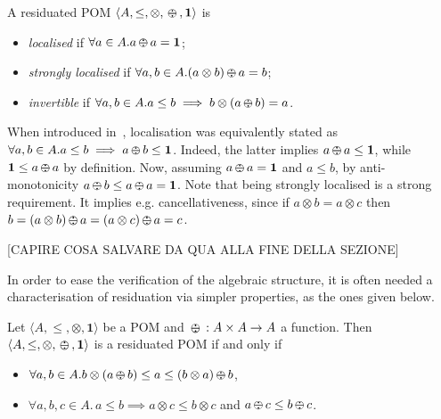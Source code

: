 \documentclass{llncs}
\def\1{{\mathbf 1}}
\def\monid{{\mathbf 0}}
\def\1{{\mathbf 1}}
\def\monop{\otimes}
\def\odiv{\, {\ominus\hspace{-7.7pt} \div} \,}
\def\monid{\mathbf{1}}
\begin{document}
\begin{definition}
	A residuated POM $\langle A, \leq, \monop, \odiv, \monid \rangle$ is
	\begin{itemize}
		\item
		\emph{localised} if $\forall a \in A. a \odiv a = \1$;
		\item
		\emph{strongly localised} if $\forall a, b \in A. (a \otimes b) \odiv a = b$;
		\item
		\emph{invertible} if $\forall a, b \in A. a \leq b \implies b \monop (a \odiv b) = a$.
	\end{itemize}
\end{definition}

\begin{remark}
When introduced in~\cite[Def.~2.4]{ipl17}, localisation was equivalently stated as 
$\forall a, b \in A. a \leq b \implies a \odiv b \leq \1$.
Indeed, the latter implies $a \odiv a \leq \1$, while  $\1 \leq a \odiv a$
by definition. Now, assuming $a \odiv a = \1$ and $a \leq b$, 
by anti-monotonicity $a \odiv b \leq a \odiv a = \1$.
Note that being strongly localised is a strong requirement. It implies e.g. 
cancellativeness, since if $a \otimes b = a \otimes c$ 
then $b = (a \otimes b) \odiv a = (a \otimes c) \odiv a = c$.
\end{remark}

[CAPIRE COSA SALVARE DA QUA ALLA FINE DELLA SEZIONE]

In order to ease the verification of the algebraic structure, it is often needed
a characterisation of residuation via simpler properties,
as the ones given below.

\begin{lemma}
\label{mono}
Let $\langle A, \leq, \monop, \monid \rangle$ be a POM  and
	$\odiv: A \times A \rightarrow A$ a function. Then $\langle A, \leq, \monop, \odiv, \monid \rangle$ is a residuated POM if and only if
	\begin{itemize}
		\item $\forall a, b \in A. b \monop (a \odiv b) \leq a \leq (b \monop a) \odiv b$,
		\item $\forall a, b, c \in A.\, a \leq b \implies a \otimes c \leq b \otimes c$ and $a\odiv c \leq b \odiv c$.
\end{itemize}
\end{lemma}
\end{document}
